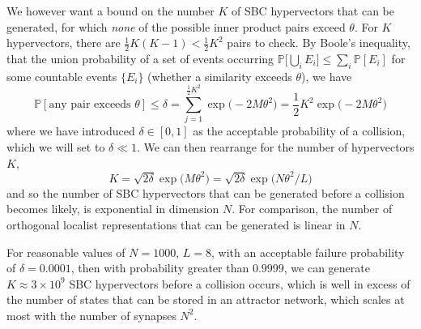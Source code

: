 We however want a bound on the number $K$ of SBC hypervectors that can be generated, for which \textit{none} of the possible inner product pairs exceed $\theta$. For $K$ hypervectors, there are $\frac{1}{2}K(K-1) < \frac{1}{2} K^2$ pairs to check. By Boole's inequality, that the union probability of a set of events occurring $\mathbb{P} \big[ \bigcup_i E_i \big] \leq \sum_i \mathbb{P}[E_i]$ for some countable events $\{E_i\}$ (whether a similarity exceeds $\theta$), we have 
\begin{equation}
\mathbb{P}[\text{any pair exceeds $\theta$}] \leq \delta  = \sum_{j = 1}^{\frac{1}{2}K^2} \exp \big( -2 M\theta^2 \big) = \frac{1}{2}K^2\exp \big( -2 M\theta^2 \big)
\end{equation}
where we have introduced $\delta \in [0,1]$ as the acceptable probability of a collision, which we will set to $\delta \ll 1$. We can then rearrange for the number of hypervectors $K$,
\begin{equation}
    K = \sqrt{2 \delta} \exp \Big( M\theta^2 \Big) = \sqrt{2 \delta} \exp \Big( N\theta^2 /L \Big) 
\end{equation}
and so the number of SBC hypervectors that can be generated before a collision becomes likely, is exponential in dimension $N$. For comparison, the number of orthogonal localist representations that can be generated is linear in $N$.

For reasonable values of $N = 1000$, $L=8$, with an acceptable failure probability of $\delta = 0.0001$, then with probability greater than $0.9999$, we can generate $K \approx 3 \times 10^9$ SBC hypervectors before a collision occurs, which is well in excess of the number of states that can be stored in an attractor network, which scales at most with the number of synapses $N^2$.

\FloatBarrier

